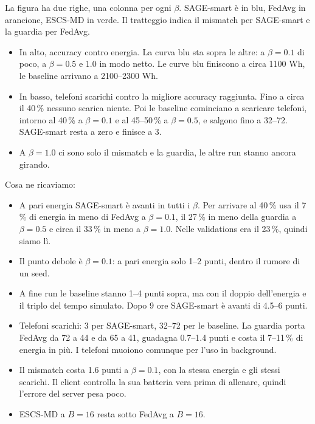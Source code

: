\documentclass[10pt,a4paper]{article}
\begin{document}
La figura ha due righe, una colonna per ogni $\beta$. SAGE-smart è in blu,
FedAvg in arancione, ESCS-MD in verde. Il tratteggio indica il mismatch per
SAGE-smart e la guardia per FedAvg.
\begin{itemize}
  \item In alto, accuracy contro energia. La curva blu sta sopra le altre: a
        $\beta = 0.1$ di poco, a $\beta = 0.5$ e $1.0$ in modo netto. Le curve
        blu finiscono a circa 1100 Wh, le baseline arrivano a 2100--2300 Wh.
  \item In basso, telefoni scarichi contro la migliore accuracy raggiunta.
        Fino a circa il 40\,\% nessuno scarica niente. Poi le baseline cominciano a
        scaricare telefoni, intorno al 40\,\% a $\beta = 0.1$ e al 45--50\,\%
        a $\beta = 0.5$, e salgono fino a 32--72. SAGE-smart resta a zero e
        finisce a 3.
  \item A $\beta = 1.0$ ci sono solo il mismatch e la guardia, le altre run
        stanno ancora girando.
\end{itemize}

Cosa ne ricaviamo:
\begin{itemize}
  \item A pari energia SAGE-smart è avanti in tutti i $\beta$. Per arrivare al
        40\,\% usa il 7\,\% di energia in meno di FedAvg a $\beta = 0.1$, il
        27\,\% in meno della guardia a $\beta = 0.5$ e circa il 33\,\% in meno
        a $\beta = 1.0$. Nelle validations era il 23\,\%, quindi siamo lì.
  \item Il punto debole è $\beta = 0.1$: a pari energia solo 1--2 punti, dentro
        il rumore di un seed.
  \item A fine run le baseline stanno 1--4 punti sopra, ma con il doppio
        dell'energia e il triplo del tempo simulato. Dopo 9 ore SAGE-smart è
        avanti di 4.5--6 punti.
  \item Telefoni scarichi: 3 per SAGE-smart, 32--72 per le baseline. La
        guardia porta FedAvg da 72 a 44 e da 65 a 41, guadagna 0.7--1.4 punti e
        costa il 7--11\,\% di energia in più. I telefoni muoiono comunque per
        l'uso in background.
  \item Il mismatch costa 1.6 punti a $\beta = 0.1$, con la stessa energia e
        gli stessi scarichi. Il client controlla la sua batteria vera prima di
        allenare, quindi l'errore del server pesa poco.
  \item ESCS-MD a $B = 16$ resta sotto FedAvg a $B = 16$.
\end{itemize}
\end{document}
